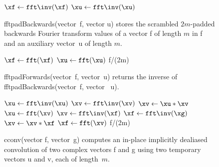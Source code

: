 \documentclass[final]{siamltex}
\begin{document}
\begin{figure}[htbp]
\begin{minipage}{0.49\linewidth}
\begin{procedure}[H]
  $\xf \leftarrow \fft\inv(\xf)$\;
  $\xu \leftarrow \fft\inv(\xu)$\;
  \caption{fftpadBackwards(vector~{\sf f}, vector {\sf u}) stores the scrambled
$2m$-padded backwards Fourier transform values of a vector
{\sf f} of length $m$ in {\sf f} and an auxiliary vector~{\sf u} of length $m$.}\label{fftpadBackwards}
\end{procedure}
\begin{function}[H]
  $\xf \leftarrow \fft(\xf)$\;
  $\xu \leftarrow \fft(\xu)$\;
  \Return f/(2m)\;
  \caption{fftpadForwards(vector~{\sf f}, vector~{\sf u}) returns the
inverse of fftpadBackwards(vector~{\sf f}, vector~{\sf
u}).}\label{fftpadForwards} 
\end{function}
%
\end{minipage}
\begin{minipage}{0.49\linewidth}
\begin{function}[H]
  \medskip
  $\xu \leftarrow \fft\inv(\xu)$\;
  $\xv \leftarrow \fft\inv(\xv)$\;
  $\xv \leftarrow \xu * \xv$\;
  $\xu \leftarrow \fft(\xv)$\;
  \medskip
  $\xv \leftarrow \fft\inv(\xf)$\;
  $\xf \leftarrow \fft\inv(\xg)$\;
  $\xv \leftarrow \xv * \xf$\;
  $\xf \leftarrow \fft(\xv)$\;
  \medskip
  \Return f/(2m)\;
\caption{cconv(vector {\sf f}, vector~{\sf g}) computes
an in-place implicitly dealiased convolution of two complex vectors {\sf f}
and {\sf g} using two temporary vectors {\sf u} and {\sf v}, each of
length~$m$.}\label{cconv}
\end{function}
\end{minipage}
\end{figure}
\end{document}
